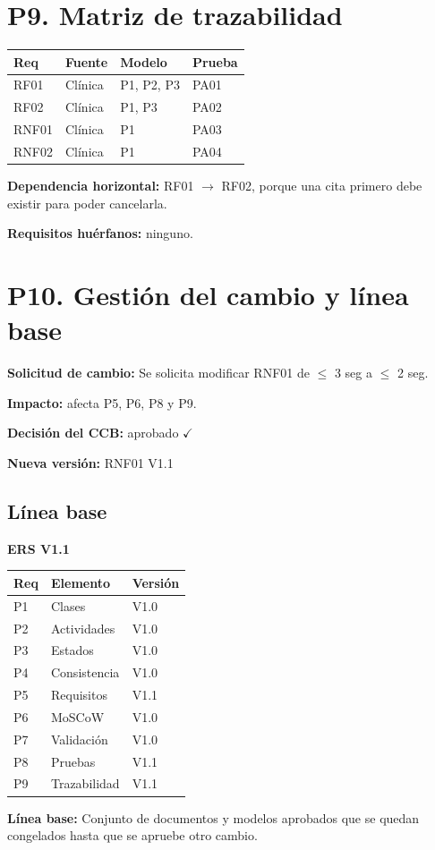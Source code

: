 \documentclass[11pt,a4paper,oneside]{article}
\begin{document}
\section*{P9. Matriz de trazabilidad}

\begin{tabular}{|p{}|p{}|p{}|p{}|}
\hline
\textbf{Req} & \textbf{Fuente} & \textbf{Modelo} & \textbf{Prueba} \\ \hline
RF01 & Clínica & P1, P2, P3 & PA01 \\ \hline
RF02 & Clínica & P1, P3 & PA02 \\ \hline
RNF01 & Clínica & P1 & PA03 \\ \hline
RNF02 & Clínica & P1 & PA04 \\ \hline
\end{tabular}

\vspace{0.3cm}

\textbf{Dependencia horizontal:} RF01 $\rightarrow$ RF02, porque una cita primero debe existir para poder cancelarla.

\textbf{Requisitos huérfanos:} ninguno.

\section*{P10. Gestión del cambio y línea base}

\textbf{Solicitud de cambio:} Se solicita modificar RNF01 de $\leq$ 3 seg a $\leq$ 2 seg.

\textbf{Impacto:} afecta P5, P6, P8 y P9.

\textbf{Decisión del CCB:} aprobado $\checkmark$

\textbf{Nueva versión:} RNF01 V1.1

\subsection*{Línea base}

\textbf{ERS V1.1}

\begin{tabular}{|p{}|p{}|p{}|}
\hline
\textbf{Req} & \textbf{Elemento} & \textbf{Versión} \\ \hline
P1 & Clases & V1.0 \\ \hline
P2 & Actividades & V1.0 \\ \hline
P3 & Estados & V1.0 \\ \hline
P4 & Consistencia & V1.0 \\ \hline
P5 & Requisitos & V1.1 \\ \hline
P6 & MoSCoW & V1.0 \\ \hline
P7 & Validación & V1.0 \\ \hline
P8 & Pruebas & V1.1 \\ \hline
P9 & Trazabilidad & V1.1 \\ \hline
\end{tabular}

\vspace{0.5cm}

\textbf{Línea base:} Conjunto de documentos y modelos aprobados que se quedan congelados hasta que se apruebe otro cambio.
\end{document}
